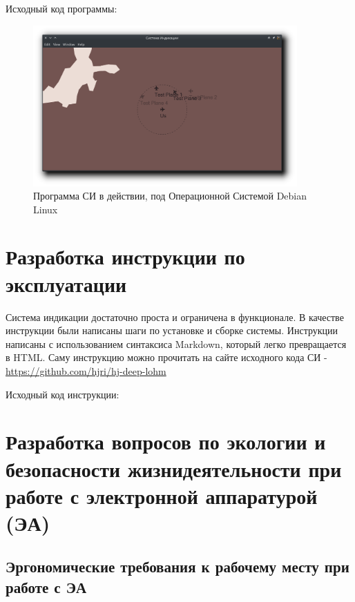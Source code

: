 \documentclass[a4paper,12pt]{report} %
\begin{document}
Исходный код программы:








\newpage
\begin{figure}[!ht]
  \includegraphics[width=0.9\textwidth]{deeplohm}
  \caption{Программа СИ в действии, под Операционной Системой Debian Linux}
\end{figure}

\newpage

\chapter{Разработка инструкции по эксплуатации}

Система индикации достаточно проста и ограничена в функционале. В качестве
инструкции были написаны шаги по установке и сборке системы. Инструкции написаны
с использованием синтаксиса Markdown, который легко превращается в HTML. Саму
инструкцию можно прочитать на сайте исходного кода СИ - \url{https://github.com/hjri/hj-deep-lohm}

Исходный код инструкции:

\newpage

\chapter{Разработка вопросов по экологии и безопасности жизнидеятельности при
  работе с электронной аппаратурой (ЭА)} %

\section{Эргономические требования к рабочему месту при работе с ЭА}
\end{document}
